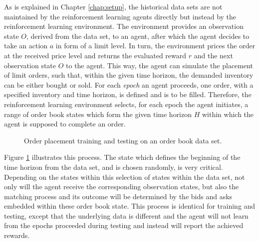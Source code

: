 As is explained in Chapter \ref{chap:setup}, the historical data sets are not maintained by the reinforcement learning agents directly but instead by the reinforcement learning environment.
The environment provides an observation state $O$, derived from the data set, to an agent, after which the agent decides to take an action $a$ in form of a limit level.
In turn, the environment prices the order at the received price level and returns the evaluated reward $r$ and the next observation state $O$ to the agent.
This way, the agent can simulate the placement of limit orders, such that, within the given time horizon, the demanded inventory can be either bought or sold.
For each \textit{epoch} an agent proceeds, one order, with a specified inventory and time horizon, is defined and is to be filled.
Therefore, the reinforcement learning environment selects, for each epoch the agent initiates, a range of order book states which form the given time horizon $H$ within which the agent is supposed to complete an order.
\begin{figure}[H]
    \centering
    \caption{Order placement training and testing on an order book data set.}
    \label{fig:eval-orderbook-window}
\end{figure}
Figure \ref{fig:eval-orderbook-window} illustrates this process.
The state which defines the beginning of the time horizon from the data set, and is chosen randomly, is very critical.
Depending on the states within this selection of states within the data set, not only will the agent receive the corresponding observation states, but also the matching process and its outcome will be determined by the bids and asks embedded within these order book state.
This process is identical for training and testing, except that the underlying data is different and the agent will not learn from the epochs proceeded during testing and instead will report the achieved rewards.

